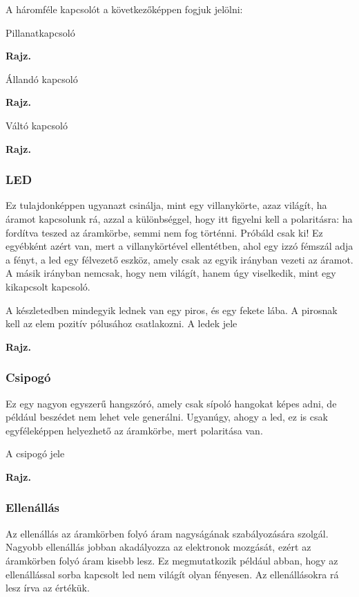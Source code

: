 \documentclass[16pt]{scrreprt}
\begin{document}
A háromféle kapcsolót a következőképpen fogjuk jelölni:

Pillanatkapcsoló

\textbf{Rajz.}

Állandó kapcsoló

\textbf{Rajz.}

Váltó kapcsoló

\textbf{Rajz.}

\subsubsection{LED}

Ez tulajdonképpen ugyanazt csinálja, mint egy villanykörte, azaz világít, ha áramot kapcsolunk rá, azzal a különbséggel, hogy itt figyelni kell a polaritásra: ha fordítva teszed az áramkörbe, semmi nem fog történni. Próbáld csak ki! Ez egyébként azért van, mert a villanykörtével ellentétben, ahol egy izzó fémszál adja a fényt, a led egy félvezető eszköz, amely csak az egyik irányban vezeti az áramot. A másik irányban nemcsak, hogy nem világít, hanem úgy viselkedik, mint egy kikapcsolt kapcsoló. 



A készletedben mindegyik lednek van egy piros, és egy fekete lába. A pirosnak kell az elem pozitív pólusához csatlakozni. A ledek jele 

\textbf{Rajz.}



\subsubsection{Csipogó}

Ez egy nagyon egyszerű hangszóró, amely csak sípoló hangokat képes adni, de például beszédet nem lehet vele generálni. Ugyanúgy, ahogy a led, ez is csak egyféleképpen helyezhető az áramkörbe, mert polaritása van.

A csipogó jele

\textbf{Rajz.}



\subsubsection{Ellenállás}

Az ellenállás az áramkörben folyó áram nagyságának szabályozására szolgál. Nagyobb ellenállás jobban akadályozza az elektronok mozgását, ezért az áramkörben folyó áram kisebb lesz. Ez megmutatkozik például abban, hogy az ellenállással sorba kapcsolt led nem világít olyan fényesen. Az ellenállásokra rá lesz írva az értékük.
\end{document}
